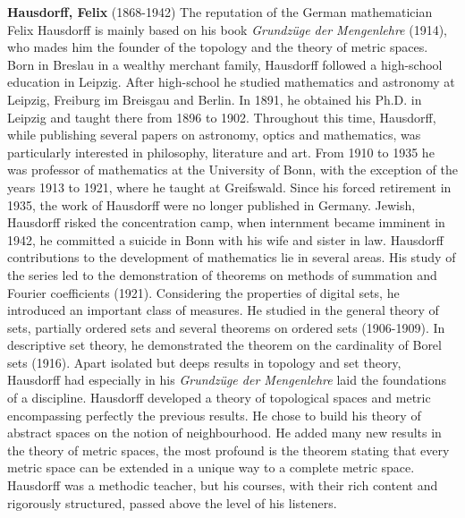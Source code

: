 \textbf{Hausdorff, Felix }(1868-1942) The reputation of the German mathematician Felix Hausdorff is mainly based on his book \textit{Grundzüge der Mengenlehre }(1914), who mades him the founder of the topology and the theory of metric spaces. Born in Breslau in a wealthy merchant family, Hausdorff followed a high-school education in Leipzig. After high-school he studied mathematics and astronomy at Leipzig, Freiburg im Breisgau and Berlin. In 1891, he obtained his Ph.D. in Leipzig and taught there from 1896 to 1902. Throughout this time, Hausdorff, while publishing several papers on astronomy, optics and mathematics, was particularly interested in philosophy, literature and art. From 1910 to 1935 he was professor of mathematics at the University of Bonn, with the exception of the years 1913 to 1921, where he taught at Greifswald. Since his forced retirement in 1935, the work of Hausdorff were no longer published in Germany. Jewish, Hausdorff risked the concentration camp, when internment became imminent in 1942, he committed a suicide in Bonn with his wife and sister in law. Hausdorff contributions to the development of mathematics lie in several areas. His study of the series led to the demonstration of theorems on methods of summation and Fourier coefficients (1921). Considering the properties of digital sets, he introduced an important class of measures. He studied in the general theory of sets, partially ordered sets and several theorems on ordered sets (1906-1909). In descriptive set theory, he demonstrated the theorem on the cardinality of Borel sets (1916). Apart isolated but deeps results in topology and set theory, Hausdorff had especially in his \textit{Grundzüge der Mengenlehre} laid the foundations of a discipline. Hausdorff developed a theory of topological spaces and metric encompassing perfectly the previous results. He chose to build his theory of abstract spaces on the notion of neighbourhood. He added many new results in the theory of metric spaces, the most profound is the theorem stating that every metric space can be extended in a unique way to a complete metric space. Hausdorff was a methodic teacher, but his courses, with their rich content and rigorously structured, passed above the level of his listeners.

